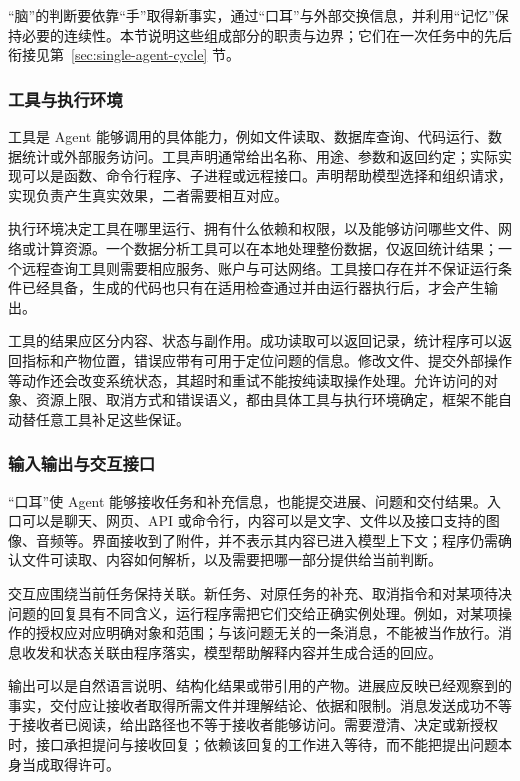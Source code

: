 \documentclass[11pt,a4paper]{article}
\begin{document}
“脑”的判断要依靠“手”取得新事实，通过“口耳”与外部交换信息，并利用“记忆”保持必要的连续性。本节说明这些组成部分的职责与边界；它们在一次任务中的先后衔接见第~\ref{sec:single-agent-cycle} 节。

\subsubsection{工具与执行环境}

工具是 Agent 能够调用的具体能力，例如文件读取、数据库查询、代码运行、数据统计或外部服务访问。工具声明通常给出名称、用途、参数和返回约定；实际实现可以是函数、命令行程序、子进程或远程接口。声明帮助模型选择和组织请求，实现负责产生真实效果，二者需要相互对应。

执行环境决定工具在哪里运行、拥有什么依赖和权限，以及能够访问哪些文件、网络或计算资源。一个数据分析工具可以在本地处理整份数据，仅返回统计结果；一个远程查询工具则需要相应服务、账户与可达网络。工具接口存在并不保证运行条件已经具备，生成的代码也只有在适用检查通过并由运行器执行后，才会产生输出。

工具的结果应区分内容、状态与副作用。成功读取可以返回记录，统计程序可以返回指标和产物位置，错误应带有可用于定位问题的信息。修改文件、提交外部操作等动作还会改变系统状态，其超时和重试不能按纯读取操作处理。允许访问的对象、资源上限、取消方式和错误语义，都由具体工具与执行环境确定，框架不能自动替任意工具补足这些保证。

\subsubsection{输入输出与交互接口}

“口耳”使 Agent 能够接收任务和补充信息，也能提交进展、问题和交付结果。入口可以是聊天、网页、API 或命令行，内容可以是文字、文件以及接口支持的图像、音频等。界面接收到了附件，并不表示其内容已进入模型上下文；程序仍需确认文件可读取、内容如何解析，以及需要把哪一部分提供给当前判断。

交互应围绕当前任务保持关联。新任务、对原任务的补充、取消指令和对某项待决问题的回复具有不同含义，运行程序需把它们交给正确实例处理。例如，对某项操作的授权应对应明确对象和范围；与该问题无关的一条消息，不能被当作放行。消息收发和状态关联由程序落实，模型帮助解释内容并生成合适的回应。

输出可以是自然语言说明、结构化结果或带引用的产物。进展应反映已经观察到的事实，交付应让接收者取得所需文件并理解结论、依据和限制。消息发送成功不等于接收者已阅读，给出路径也不等于接收者能够访问。需要澄清、决定或新授权时，接口承担提问与接收回复；依赖该回复的工作进入等待，而不能把提出问题本身当成取得许可。
\end{document}
